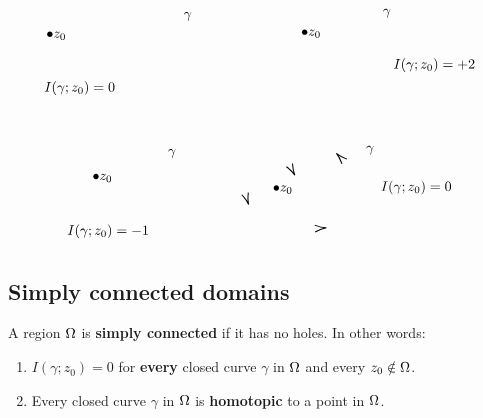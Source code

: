 \documentclass[12pt]{article}
\begin{document}
\[\begin{tikzpicture}[x=0.75pt,y=0.75pt,yscale=-1,xscale=1]
    \draw [shift={(270.24,179.71)}, rotate = 241.88] [color={rgb, 255:red, 0; green, 0; blue, 0 }  ][line width=0.75]    (10.93,-3.29) .. controls (6.95,-1.4) and (3.31,-0.3) .. (0,0) .. controls (3.31,0.3) and (6.95,1.4) .. (10.93,3.29)   ;
    \draw [shift={(309.89,158.79)}, rotate = 45.62] [color={rgb, 255:red, 0; green, 0; blue, 0 }  ][line width=0.75]    (10.93,-3.29) .. controls (6.95,-1.4) and (3.31,-0.3) .. (0,0) .. controls (3.31,0.3) and (6.95,1.4) .. (10.93,3.29)   ;
    \draw [shift={(300.31,229.97)}, rotate = 176.13] [color={rgb, 255:red, 0; green, 0; blue, 0 }  ][line width=0.75]    (10.93,-3.29) .. controls (6.95,-1.4) and (3.31,-0.3) .. (0,0) .. controls (3.31,0.3) and (6.95,1.4) .. (10.93,3.29)   ;
    \draw [shift={(226.13,207.76)}, rotate = 252.08] [color={rgb, 255:red, 0; green, 0; blue, 0 }  ][line width=0.75]    (10.93,-3.29) .. controls (6.95,-1.4) and (3.31,-0.3) .. (0,0) .. controls (3.31,0.3) and (6.95,1.4) .. (10.93,3.29)   ;
    
    \draw (32,41) node [anchor=north west][inner sep=0.75pt]   [align=left] {$\displaystyle \bullet z_{0}$};
    \draw (163,22.4) node [anchor=north west][inner sep=0.75pt]    {$\gamma $};
    \draw (30,88.4) node [anchor=north west][inner sep=0.75pt]    {$I( \gamma ;z_{0}) =0$};
    \draw (275,39) node [anchor=north west][inner sep=0.75pt]   [align=left] {$\displaystyle \bullet z_{0}$};
    \draw (353,19.4) node [anchor=north west][inner sep=0.75pt]    {$\gamma $};
    \draw (363,66.4) node [anchor=north west][inner sep=0.75pt]    {$I( \gamma ;z_{0}) =+2$};
    \draw (76,177) node [anchor=north west][inner sep=0.75pt]   [align=left] {$\displaystyle \bullet z_{0}$};
    \draw (148,153.4) node [anchor=north west][inner sep=0.75pt]    {$\gamma $};
    \draw (52,225.4) node [anchor=north west][inner sep=0.75pt]    {$I( \gamma ;z_{0}) =-1$};
    \draw (248,188) node [anchor=north west][inner sep=0.75pt]   [align=left] {$\displaystyle \bullet z_{0}$};
    \draw (337,150.4) node [anchor=north west][inner sep=0.75pt]    {$\gamma $};
    \draw (351,183.4) node [anchor=north west][inner sep=0.75pt]    {$I( \gamma ;z_{0}) =0$};
    
    
    \end{tikzpicture}
    \]

\subsection{Simply connected domains}
 A region $\Omega$ is \textbf{simply connected} if it has no holes. In other words: \begin{enumerate}[label=(\alph*)]
    \item $I(\gamma;z_0)=0$ for \textbf{every} closed curve $\gamma$ in $\Omega$ and every $z_0\notin \Omega$. 
    \item Every closed curve $\gamma$ in $\Omega$ is \textbf{homotopic} to a point in $\Omega$.
\end{enumerate}
\end{document}
